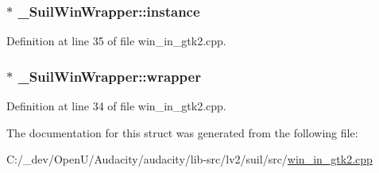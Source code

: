 \subsubsection[{\texorpdfstring{instance}{instance}}]{$\ast$ \+\_\+\+Suil\+Win\+Wrapper\+::instance}\hypertarget{struct___suil_win_wrapper_a15b345aa959d37b583e44efe6f4daab5}{}\label{struct___suil_win_wrapper_a15b345aa959d37b583e44efe6f4daab5}


Definition at line 35 of file win\+\_\+in\+\_\+gtk2.\+cpp.

\subsubsection[{\texorpdfstring{wrapper}{wrapper}}]{$\ast$ \+\_\+\+Suil\+Win\+Wrapper\+::wrapper}\hypertarget{struct___suil_win_wrapper_ad14391718a24958bf0cd6feb61fa0103}{}\label{struct___suil_win_wrapper_ad14391718a24958bf0cd6feb61fa0103}


Definition at line 34 of file win\+\_\+in\+\_\+gtk2.\+cpp.



The documentation for this struct was generated from the following file\+:\begin{DoxyCompactItemize}
\item 
C\+:/\+\_\+dev/\+Open\+U/\+Audacity/audacity/lib-\/src/lv2/suil/src/\hyperlink{win__in__gtk2_8cpp}{win\+\_\+in\+\_\+gtk2.\+cpp}\end{DoxyCompactItemize}
